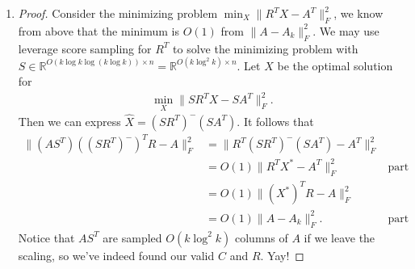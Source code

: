 \documentclass[11pt]{article}
\begin{document}
\begin{enumerate}[1.]
\begin{proof}
\begin{align*}
  &\le O(1)\|\widehat{U}\widehat{V} - A\|_F^2 &X^* \text{ optimal}\\
  &= O(1)\|A - A_k\|_F^2. &\text{low rank approximation}
\end{align*}
This means that $SA$ just works since $\widehat{U}(S\widehat{U})^-$ is one such solution for $U$ and the minimum must be at most $O(1)\|A - A_k\|_F^2$. Note that to get $R$ we need to express $S$ as $D \Omega^T$ where $D$ is for scaling and $\Omega^T$ is for sampling, and take $R = \Omega^T A$.
\end{proof}
\item \begin{proof}
Consider the minimizing problem $\min_X \|R^T X - A^T\|_F^2$, we know from above that the minimum is $O(1)$ from $\|A - A_k\|_F^2$. We may use leverage score sampling for $R^T$ to solve the minimizing problem with $S \in \mathbb{R}^{O(k\log k \log(k\log k)) \times n} = \mathbb{R}^{O(k\log^2k) \times n}$. Let $\widehat{X}$ be the optimal solution for
\begin{align*}
  \min_X \|SR^TX - SA^T\|_F^2.
\end{align*}
Then we can express $\widehat{X} = (SR^T)^-(SA^T)$. It follows that
\begin{align*}
  \|(AS^T)\left((SR^T)^-\right)^TR - A\|_F^2 &=
  \|R^T(SR^T)^-(SA^T) - A^T\|_F^2 \\
  &= O(1)\|R^TX^* - A^T\|_F^2 &\text{part 1}\\
  &= O(1)\|(X^*)^T R - A\|_F^2\\
  &= O(1)\|A - A_k\|_F^2. &\text{part 2}
\end{align*}
Notice that $AS^T$ are sampled $O(k\log^2 k)$ columns of $A$ if we leave the scaling, so we've indeed found our valid $C$ and $R$. Yay!
\end{proof}
\end{enumerate}
\end{document}
